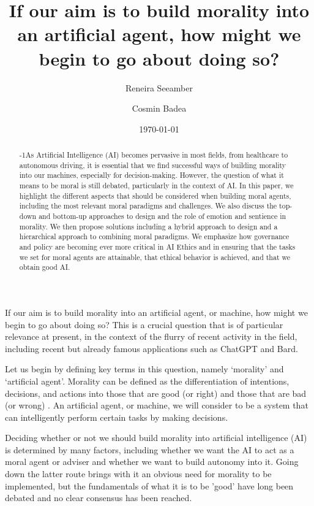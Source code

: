 \documentclass[10pt]{article}
\title{If our aim is to build morality into an artificial agent, how might we begin to go about doing so?}
\author[1]{Reneira Seeamber}
\author[1]{Cosmin Badea}
\affil[1]{Department of Computing, Imperial College London, London, SW7 2BX, United Kingdom}
\date{\today}
\begin{document}
\maketitle

\begin{abstract}\looseness-1As Artificial Intelligence (AI) becomes pervasive in most fields, from healthcare to autonomous driving, it is essential that we find successful ways of building morality into our machines, especially for decision-making. However, the question of what it means to be moral is still debated, particularly in the context of AI. In this paper, we highlight the different aspects that should be considered when building moral agents, including the most relevant moral paradigms and challenges. We also discuss the top-down and bottom-up approaches to design and the role of emotion and sentience in morality. We then propose solutions including a hybrid approach to design and a hierarchical approach to combining moral paradigms. We emphasize how governance and policy are becoming ever more critical in AI Ethics and in ensuring that the tasks we set for moral agents are attainable, that ethical behavior is achieved, and that we obtain good AI.
\end{abstract}


If our aim is to build morality into an artificial agent, or machine, how might we begin to go about doing so? This is a crucial question that is of particular relevance at present, in the context of the flurry of recent activity in the field, including recent but already famous applications such as ChatGPT and Bard. 

Let us begin by defining key terms in this question, namely ‘morality’ and ‘artificial agent’. Morality can be defined as the differentiation of intentions, decisions, and actions into those that are good (or right) and those that are bad (or wrong) \textsuperscript{\cite{khatibi_morality_2016}}. An artificial agent, or machine, we will consider to be a system that can intelligently perform certain tasks by making decisions.


Deciding whether or not we should build morality into artificial intelligence (AI) is determined by many factors, including whether we want the AI to act as a moral agent or adviser and whether we want to build autonomy into it. Going down the latter route brings with it an obvious need for morality to be implemented, but the fundamentals of what it is to be 'good' have long been debated and no clear consensus has been reached\textsuperscript{\cite{badea_have_2022}}. 
\end{document}
